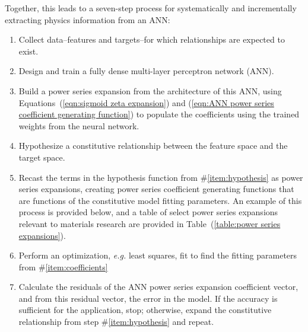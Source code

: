 Together, this leads to a seven-step process for systematically and incrementally extracting physics information from an ANN:
\begin{enumerate}
	\item Collect data--features and targets--for which relationships are expected to exist.
	\item Design and train a fully dense multi-layer perceptron network (ANN).
	\item Build a power series expansion from the architecture of this ANN, using Equations~(\ref{eqn:sigmoid zeta expansion}) and (\ref{eqn:ANN power series coefficient generating function}) to populate the coefficients using the trained weights from the neural network.
	\item Hypothesize a constitutive relationship between the feature space and the target space. \label{item:hypothesis}
	\item Recast the terms in the hypothesis function from \#\ref{item:hypothesis} as power series expansions, creating power series coefficient generating functions that are functions of the constitutive model fitting parameters. An example of this process is provided below, and a table of select power series expansions relevant to materials research are provided in Table~(\ref{table:power series expansions}). \label{item:coefficients}
	\item Perform an optimization, \emph{e.g.} least squares, fit to find the fitting parameters from \#\ref{item:coefficients}
	\item Calculate the residuals of the ANN power series expansion coefficient vector, and from this residual vector, the error in the model. If the accuracy is sufficient for the application, stop; otherwise, expand the constitutive relationship from step \#\ref{item:hypothesis} and repeat.
\end{enumerate}

